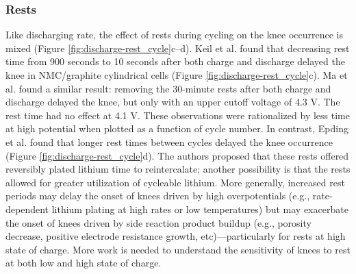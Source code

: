 \documentclass[journal=jpclcd,manuscript=article]{achemso}
\begin{document}
\subsubsection{Rests}

Like discharging rate, the effect of rests during cycling on the knee occurrence is mixed (Figure \ref{fig:discharge-rest_cycle}c--d).
Keil et al.\cite{keil_linear_2019} found that decreasing rest time from 900 seconds to 10 seconds after both charge and discharge delayed the knee in NMC/graphite cylindrical cells (Figure \ref{fig:discharge-rest_cycle}c).
Ma et al.\cite{ma_editors_2019} found a similar result: removing the 30-minute rests after both charge and discharge delayed the knee, but only with an upper cutoff voltage of 4.3 V. The rest time had no effect at 4.1 V.
These observations were rationalized by less time at high potential when plotted as a function of cycle number.
In contrast, Epding et al.\cite{epding_investigation_2019} found that longer rest times between cycles delayed the knee occurrence (Figure \ref{fig:discharge-rest_cycle}d). The authors proposed that these rests offered reversibly plated lithium time to reintercalate; another possibility is that the rests allowed for greater utilization of cycleable lithium\cite{rashid_effect_2015}. More generally, increased rest periods may delay the onset of knees driven by high overpotentials (e.g., rate-dependent lithium plating at high rates or low temperatures) but may exacerbate the onset of knees driven by side reaction product buildup (e.g., porosity decrease, positive electrode resistance growth, etc)---particularly for rests at high state of charge. More work is needed to understand the sensitivity of knees to rest at both low and high state of charge.
\end{document}
